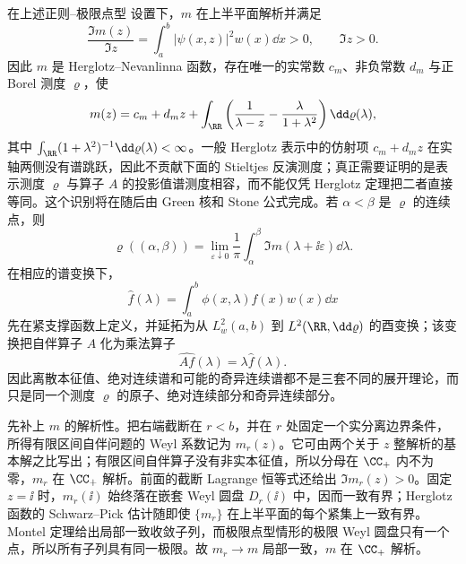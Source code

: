 \begin{theorem}\label{thm:math-sl-weyl-m-spectral-measure}
在上述正则--极限点型 设置下，$m$ 在上半平面解析并满足
\begin{equation}\label{eq:math-sl-m-herglotz}
 \frac{\Im m(z)}{\Im z}
 =\int_a^b|\psi(x,z)|^2w(x)\dd x>0,
 \qquad \Im z>0.
\end{equation}
因此 $m$ 是 Herglotz--Nevanlinna 函数，存在唯一的实常数 $c_m$、非负常数 $d_m$ 与正 Borel 测度 $\varrho$，使
\begin{equation}\label{eq:math-sl-m-herglotz-representation}
 m(z)=c_m+d_m z+
 \int_{\RR}\left(
 \frac{1}{\lambda-z}-\frac{\lambda}{1+\lambda^2}
 \right)\dd\varrho(\lambda),
\end{equation}
其中 $\int_{\RR}(1+\lambda^2)^{-1}\dd\varrho(\lambda)<\infty$。一般 Herglotz 表示中的仿射项 $c_m+d_mz$ 在实轴两侧没有谱跳跃，因此不贡献下面的 Stieltjes 反演测度；真正需要证明的是表示测度 $\varrho$ 与算子 $A$ 的投影值谱测度相容，而不能仅凭 Herglotz 定理把二者直接等同。这个识别将在随后由 Green 核和 Stone 公式完成。若 $\alpha<\beta$ 是 $\varrho$ 的连续点，则
\begin{equation}\label{eq:math-sl-m-stieltjes-inversion}
 \varrho((\alpha,\beta))
 =\lim_{\varepsilon\downarrow0}
 \frac{1}{\pi}\int_\alpha^\beta
 \Im m(\lambda+\ii\varepsilon)\dd\lambda.
\end{equation}
在相应的谱变换下，
\begin{equation*}\widehat f(\lambda)
 =\int_a^b\phi(x,\lambda)f(x)w(x)\dd x
\end{equation*}
先在紧支撑函数上定义，并延拓为从 $L^2_w(a,b)$ 到 $L^2(\RR,\dd\varrho)$ 的酉变换；该变换把自伴算子 $A$ 化为乘法算子
\[
 \widehat{Af}(\lambda)=\lambda\widehat f(\lambda).
\]
因此离散本征值、绝对连续谱和可能的奇异连续谱都不是三套不同的展开理论，而只是同一个测度 $\varrho$ 的原子、绝对连续部分和奇异连续部分。
\end{theorem}

先补上 $m$ 的解析性。把右端截断在 $r<b$，并在 $r$ 处固定一个实分离边界条件，所得有限区间自伴问题的 Weyl 系数记为 $m_r(z)$。它可由两个关于 $z$ 整解析的基本解之比写出；有限区间自伴算子没有非实本征值，所以分母在 $\CC_+$ 内不为零，$m_r$ 在 $\CC_+$ 解析。前面的截断 Lagrange 恒等式还给出 $\Im m_r(z)>0$。固定 $z=\ii$ 时，$m_r(\ii)$ 始终落在嵌套 Weyl 圆盘 $D_r(\ii)$ 中，因而一致有界；Herglotz 函数的 Schwarz--Pick 估计随即使 $\{m_r\}$ 在上半平面的每个紧集上一致有界。Montel 定理给出局部一致收敛子列，而极限点型情形的极限 Weyl 圆盘只有一个点，所以所有子列具有同一极限。故 $m_r\to m$ 局部一致，$m$ 在 $\CC_+$ 解析。

